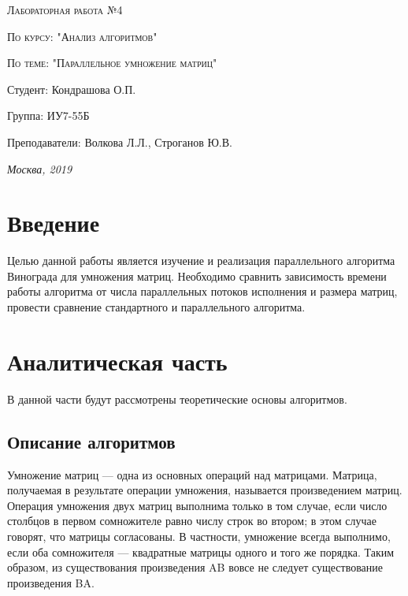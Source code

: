 \documentclass[a4paper, 14pt]{article}
\begin{document}
\begin{titlepage}
	\centering
	{\scshape\Large Лабораторная работа №4\par}
	{\scshape\Large По курсу: "Анализ алгоритмов"\par}
	{\scshape\Large По теме: "Параллельное умножение матриц"\par}
	\vspace{7cm}
	\Large Студент: Кондрашова О.П.\par
	\Large Группа: ИУ7-55Б\par
	\Large Преподаватели:  Волкова Л.Л., Строганов Ю.В.\par

	\vfill
	\large \textit {Москва, 2019} \par
	\end{titlepage}
	
	\setcounter{page}{2}
	\tableofcontents
	
	\newpage
	\section*{Введение}
	
	
		 Целью данной работы является изучение и реализация параллельного алгоритма Винограда для умножения матриц. Необходимо сравнить зависимость времени работы алгоритма от числа параллельных потоков исполнения и размера матриц, провести сравнение стандартного и параллельного алгоритма.
	
	\newpage
	\section{Аналитическая часть}
	
	В данной части будут рассмотрены теоретические основы алгоритмов.
	
	\subsection{Описание алгоритмов}
	
	Умножение матриц — одна из основных операций над матрицами. Матрица, получаемая в результате операции умножения, называется произведением матриц. Операция умножения двух матриц выполнима только в том случае, если число столбцов в первом сомножителе равно числу строк во втором; в этом случае говорят, что матрицы согласованы. В частности, умножение всегда выполнимо, если оба сомножителя — квадратные матрицы одного и того же порядка. Таким образом, из существования произведения AB вовсе не следует существование произведения BA.
\end{document}
